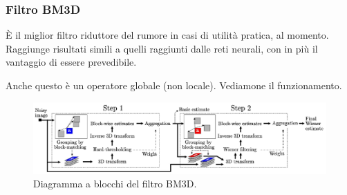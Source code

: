 \documentclass[a4paper,11pt]{article}
\begin{document}
\subsubsection{Filtro BM3D}
È il miglior filtro riduttore del rumore in casi di utilità pratica, al momento. Raggiunge risultati simili a quelli raggiunti dalle
reti neurali, con in più il vantaggio di essere prevedibile.
\par
Anche questo è un operatore globale (non locale). Vediamone il funzionamento.

\renewcommand{\thefigure}{8.4}
\begin{figure}[!h]
  \centering
    \includegraphics[scale=0.35]{images/8/bm3d_diagram.png}
    \caption{Diagramma a blocchi del filtro BM3D.}
\end{figure}
\end{document}
